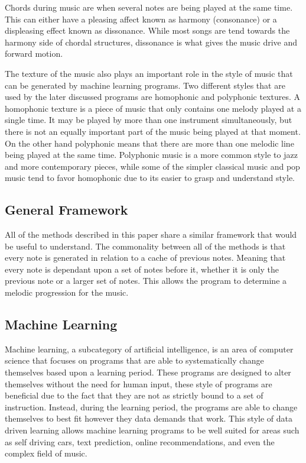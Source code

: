\documentclass{sig-alternate}
\begin{document}
Chords during music are when several notes are being played at the same time. This can either have a pleasing affect known as harmony (consonance) or a displeasing effect known as dissonance. While most songs are tend towards the harmony side of chordal structures, dissonance is what gives the music drive and forward motion.

The texture of the music also plays an important role in the style of music that can be generated by machine learning programs. Two different styles that are used by the later discussed programs are homophonic and polyphonic textures. A homophonic texture is a piece of music that only contains one melody played at a single time. It may be played by more than one instrument simultaneously, but there is not an equally important part of the music being played at that moment. On the other hand polyphonic means that there are more than one melodic line being played at the same time. Polyphonic music is a more common style to jazz and more contemporary pieces, while some of the simpler classical music and pop music tend to favor homophonic due to its easier to grasp and understand style.
\subsection{General Framework}
\label{sec:framework}
	All of the methods described in this paper share a similar framework that would be useful to understand. The commonality between all of the methods is that every note is generated in relation to a cache of previous notes. Meaning that every note is dependant upon a set of notes before it, whether it is only the previous note or a larger set of notes. This allows the program to determine a melodic progression for the music.

\subsection{Machine Learning}
\label{sec:machinelearning}
	Machine learning, a subcategory of artificial intelligence, is an area of computer science that focuses on programs that are able to systematically change themselves based upon a learning period. These programs are designed to alter themselves without the need for human input, these style of programs are beneficial due to the fact that they are not as strictly bound to a set of instruction. Instead, during the learning period, the programs are able to change themselves to best fit however they data demands that work. This style of data driven learning allows machine learning programs to be well suited for areas such as self driving cars, text prediction, online recommendations, and even the complex field of music.
\end{document}
